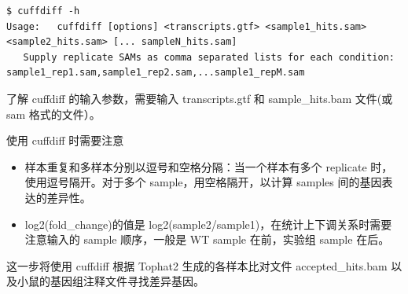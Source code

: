 \documentclass[
  a4paper,
]{article}
\providecommand{\tightlist}{%
  \setlength{\itemsep}{0pt}\setlength{\parskip}{0pt}}\usepackage{longtable,booktabs,array}
\begin{document}
\begin{lstlisting}
$ cuffdiff -h
Usage:   cuffdiff [options] <transcripts.gtf> <sample1_hits.sam> <sample2_hits.sam> [... sampleN_hits.sam]
   Supply replicate SAMs as comma separated lists for each condition: sample1_rep1.sam,sample1_rep2.sam,...sample1_repM.sam
\end{lstlisting}

了解 cuffdiff 的输入参数，需要输入 transcripts.gtf 和 sample\_hits.bam
文件(或 sam 格式的文件）。

使用 cuffdiff 时需要注意

\begin{itemize}
\tightlist
\item
  样本重复和多样本分别以逗号和空格分隔：当一个样本有多个 replicate
  时，使用逗号隔开。对于多个 sample，用空格隔开，以计算 samples
  间的基因表达的差异性。
\item
  log2(fold\_change)的值是
  log2(sample2/sample1)，在统计上下调关系时需要注意输入的 sample
  顺序，一般是 WT sample 在前，实验组 sample 在后。
\end{itemize}

这一步将使用 cuffdiff 根据 Tophat2 生成的各样本比对文件
accepted\_hits.bam 以及小鼠的基因组注释文件寻找差异基因。
\end{document}
